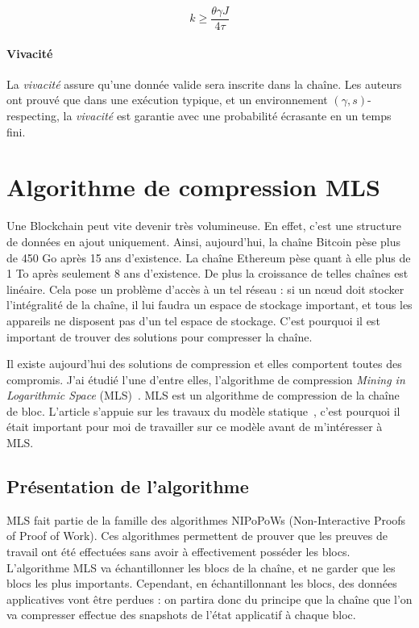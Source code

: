     \begin{equation}
        k \geq \frac{\theta \gamma J}{4\tau}
    \end{equation}

    \paragraph{Vivacité} La \textit{vivacité} assure qu'une donnée valide sera
    inscrite dans la chaîne. Les auteurs ont prouvé que dans une exécution
    typique, et un environnement $(\gamma, s)$-respecting, la \textit{vivacité}
    est garantie avec une probabilité écrasante en un temps fini.


\section{Algorithme de compression MLS}\label{sec:mls}
 
    Une Blockchain peut vite devenir très volumineuse. En effet, c'est une
    structure de données en ajout uniquement. Ainsi, aujourd'hui, la chaîne
    Bitcoin pèse plus de 450 Go après 15 ans d'existence. La chaîne Ethereum
    pèse quant à elle plus de 1 To après seulement 8 ans d'existence. De plus la
    croissance de telles chaînes est linéaire. Cela pose un problème d'accès à
    un tel réseau : si un nœud doit stocker l'intégralité de la chaîne, il lui
    faudra un espace de stockage important, et tous les appareils ne disposent
    pas d'un tel espace de stockage. C'est pourquoi il est important de trouver
    des solutions pour compresser la chaîne.
    
    Il existe aujourd'hui des solutions de compression et elles comportent
    toutes des compromis. J'ai étudié l'une d'entre elles, l'algorithme de
    compression \textit{Mining in Logarithmic Space} (MLS)~\cite{mls}. MLS est
    un algorithme de compression de la chaîne de bloc. L'article s'appuie sur
    les travaux du modèle statique~\cite{static_backbone}, c'est pourquoi il
    était important pour moi de travailler sur ce modèle avant de m'intéresser à
    MLS.
    

    \subsection{Présentation de l'algorithme}\label{subsec:mls_presentation}

    MLS fait partie de la famille des algorithmes NIPoPoWs (Non-Interactive
    Proofs of Proof of Work). Ces algorithmes permettent de prouver que les
    preuves de travail ont été effectuées sans avoir à effectivement posséder
    les blocs. L'algorithme MLS va échantillonner les blocs de la chaîne, et ne
    garder que les blocs les plus importants. Cependant, en échantillonnant les
    blocs, des données applicatives vont être perdues : on partira donc du
    principe que la chaîne que l'on va compresser effectue des snapshots de
    l'état applicatif à chaque bloc.
    
